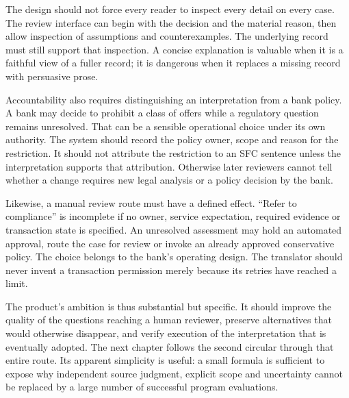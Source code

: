 The design should not force every reader to inspect every detail on every case.
The review interface can begin with the decision and the material reason, then
allow inspection of assumptions and counterexamples. The underlying record must
still support that inspection. A concise explanation is valuable when it is a
faithful view of a fuller record; it is dangerous when it replaces a missing
record with persuasive prose.

Accountability also requires distinguishing an interpretation from a bank policy.
A bank may decide to prohibit a class of offers while a regulatory question
remains unresolved. That can be a sensible operational choice under its own
authority. The system should record the policy owner, scope and reason for the
restriction. It should not attribute the restriction to an SFC sentence unless
the interpretation supports that attribution. Otherwise later reviewers cannot
tell whether a change requires new legal analysis or a policy decision by the
bank.

Likewise, a manual review route must have a defined effect. ``Refer to compliance''
is incomplete if no owner, service expectation, required evidence or transaction
state is specified. An unresolved assessment may hold an automated approval,
route the case for review or invoke an already approved conservative policy. The
choice belongs to the bank's operating design. The translator should never
invent a transaction permission merely because its retries have reached a limit.

The product's ambition is thus substantial but specific. It should improve the
quality of the questions reaching a human reviewer, preserve alternatives that
would otherwise disappear, and verify execution of the interpretation that is
eventually adopted. The next chapter follows the second circular through that
entire route. Its apparent simplicity is useful: a small formula is sufficient
to expose why independent source judgment, explicit scope and uncertainty cannot
be replaced by a large number of successful program evaluations.
